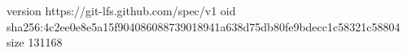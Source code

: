version https://git-lfs.github.com/spec/v1
oid sha256:4c2ee0e8e5a15f904086088739018941a638d75db80fe9bdecc1c58321c58804
size 131168
